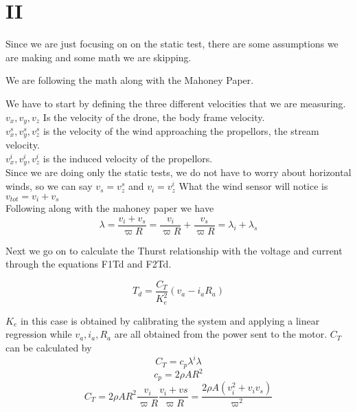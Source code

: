 \documentclass[twocolumn]{article}
\begin{document}
\section{II}

Since we are just focusing on on the static test, there are some assumptions we are making and some math we are skipping. 

We are following the math along with the Mahoney Paper.

We have to start by defining the three different velocities that we are measuring.\\

$v_{x} , v_{y} , v_{z}$  Is the velocity of the drone, the body frame velocity. \\
$v^s_{x} , v^s_{y} , v^s_{z}$ is the velocity of the wind approaching the propellors, the stream velocity. \\
$v^i_{x} , v^i_{y} , v^i_{z}$ is the induced velocity of the propellors.\\

Since we are doing only the static tests, we do not have to worry about horizontal winds, so we can say $v_s = v^s_{z}$ and $v_i = v^i_{z}$
What the wind sensor will notice is $v_{tot} = v_{i} + v_{s}$\\

Following along with the mahoney paper we have
\begin{equation}
\lambda = \frac{v_{i} + v_{s}}{\varpi R}
= \frac{v_{i}}{\varpi R}+\frac{v_{s}}{\varpi R}
=\lambda_{i} + \lambda_{s}
\end{equation}

Next we go on to calculate the Thurst relationship with the voltage and current through the equations F1Td and F2Td.

\begin{equation}
T_{d} = \frac{C_{T}}{K^2_{e}}(v_{a} - i_{a}R_{a})
\end{equation}

$K_{e}$ in this case is obtained by calibrating the system and applying a linear regression while $v_{a}, i_{a}, R_{a}$ are all obtained from the power sent to the motor. $C_{T}$ can be calculated by 
\begin{equation}
C_{T} = c_{p} \lambda ^i \lambda 
\end{equation}
\begin{equation}
c_{p} = 2 \rho A R^2 \nonumber
\end{equation}
\begin{equation}
C_{T} = 2 \rho A R^2 \frac{v_{i}}{\varpi R}\frac{v_{i} + v{s}}{\varpi R}  = \frac{2 \rho A (v_{i}^2 + v_{i}v_{s})}{\varpi ^2}
\end{equation}
\end{document}
